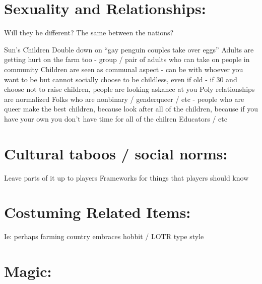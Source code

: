 \documentclass[blue]{GL2020}
\begin{document}
\section{Sexuality and Relationships:}

Will they be different? The same between the nations?

Sun’s Children
Double down on “gay penguin couples take over eggs”
Adults are getting hurt on the farm too - group / pair of adults who can take on people in community
Children are seen as communal aspect - can be with whoever you want to be but cannot socially choose to be childless, even if old - if 30 and choose not to raise children, people are looking askance at you
Poly relationships are normalized
Folks who are nonbinary / genderqueer / etc - people who are queer make the best children, because look after all of the children, because if you have your own you don’t have time for all of the chilren
Educators / etc

\section{Cultural taboos / social norms:}

Leave parts of it up to players
Frameworks for things that players should know

\section{Costuming Related Items:}

Ie: perhaps farming country embraces hobbit / LOTR type style

\section{Magic:}
\end{document}
